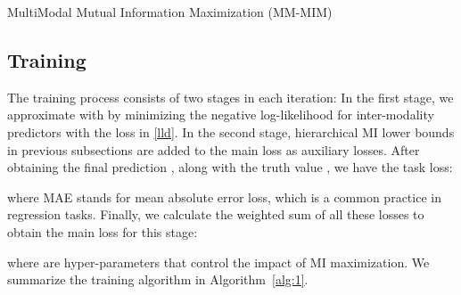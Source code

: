 \documentclass[11pt]{article}
\begin{document}
\begin{algorithm}[ht!]
\small
\SetAlgoLined
{}
\caption{\small MultiModal Mutual Information Maximization (MM-MIM)}
\label{alg:1}
\end{algorithm} 
\subsection{Training}
The training process consists of two stages in each iteration:
In the first stage, we approximate  with  by minimizing the negative log-likelihood for inter-modality predictors with the loss in \eqref{lld}.
In the second stage, hierarchical MI lower bounds in previous subsections are added to the main loss as auxiliary losses.
After obtaining the final prediction , along with the truth value , we have the task loss: 

where MAE stands for mean absolute error loss, which is a common practice in regression tasks. 
Finally, we calculate the weighted sum of all these losses to obtain the main loss for this stage:

where  are hyper-parameters that control the impact of MI maximization.
We summarize the training algorithm in Algorithm~\ref{alg:1}.
\end{document}
